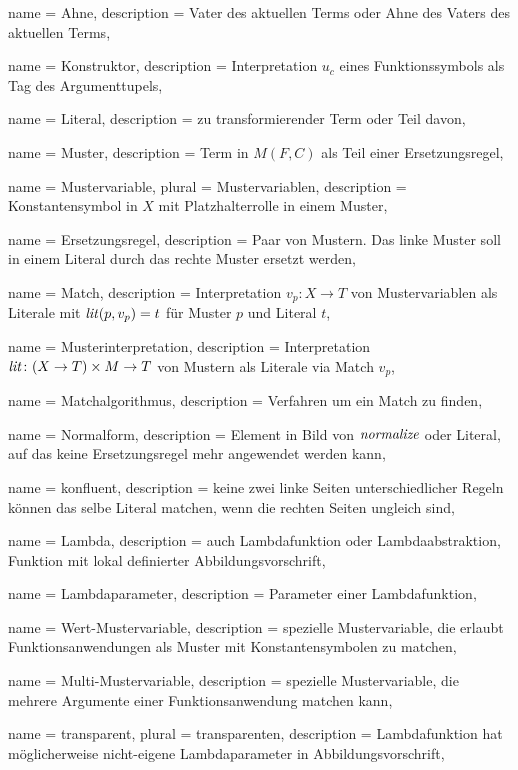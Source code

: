 {
    name = Ahne,
    description = {Vater des aktuellen Terms oder Ahne des Vaters des aktuellen Terms},
}

{
    name = Konstruktor,
    description = {Interpretation $u_c$ eines Funktionssymbols als Tag des Argumenttupels},
}


{
    name = Literal,
    description = {zu transformierender Term oder Teil davon},
}

{
    name = Muster,
    description = {Term in $M(F, C)$ als Teil einer Ersetzungsregel},
}

{
    name = Mustervariable,
    plural = Mustervariablen,
    description = {Konstantensymbol in $X$ mit Platzhalterrolle in einem Muster},
}

{
    name = Ersetzungsregel,
    description = {Paar von Mustern. Das linke Muster soll in einem Literal durch das rechte Muster ersetzt werden},
}

{
    name = Match,
    description = {Interpretation $v_p \colon X \rightarrow T$ von Mustervariablen als Literale mit $\mathit{lit}(p, v_p) = t$ für Muster $p$ und Literal $t$},
}

{
    name = Musterinterpretation,
    description = {Interpretation $\Const{lit} \colon \paren*{X \rightarrow T} \times M \rightarrow T$ von Mustern als Literale via Match $v_p$},
}

{
    name = Matchalgorithmus,
    description = {Verfahren um ein Match zu finden},
}

{
    name = Normalform,
    description = {Element in Bild von $\mathit{normalize}$ oder Literal, auf das keine Ersetzungsregel mehr angewendet werden kann},
}

{
    name = konfluent,
    description = {keine zwei linke Seiten unterschiedlicher Regeln können das selbe Literal matchen, wenn die rechten Seiten ungleich sind},
}

{
    name = Lambda,
    description = {auch Lambdafunktion oder Lambdaabstraktion, Funktion mit lokal definierter Abbildungsvorschrift},
}

{
    name = Lambdaparameter,
    description = {Parameter einer Lambdafunktion},
}

{
    name = Wert-Mustervariable,
    description = {spezielle Mustervariable, die erlaubt Funktionsanwendungen als Muster mit Konstantensymbolen zu matchen},
}

{
    name = Multi-Mustervariable,
    description = {spezielle Mustervariable, die mehrere Argumente einer Funktionsanwendung matchen kann},
}

{
    name = transparent,
    plural = transparenten,
    description = {Lambdafunktion hat möglicherweise nicht-eigene Lambdaparameter in Abbildungsvorschrift},
}




